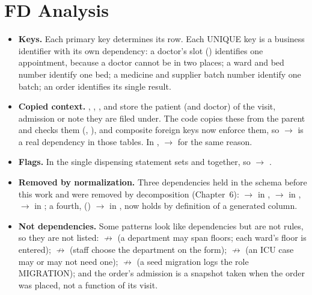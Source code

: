 \section{FD Analysis}
\begin{itemize}
\item \textbf{Keys.} Each primary key determines its row. Each UNIQUE key is a business identifier with its own
dependency: a doctor's slot () identifies one appointment,
because a doctor cannot be in two places; a ward and bed number identify one bed; a medicine and supplier batch
number identify one batch; an order identifies its single result.
\item \textbf{Copied context.} , , , 
and  store the patient (and doctor) of the visit, admission or note they are filed under. The
code copies these from the parent and checks them (, ),
and composite foreign keys now enforce them, so  $\to$  is a real
dependency in those tables. In ,  $\to$  for the same reason.
\item \textbf{Flags.} In  the single dispensing statement sets
 and  together, so  $\to$ .
\item \textbf{Removed by normalization.} Three dependencies held in the schema before this work and were removed
by decomposition (Chapter~6):  $\to$  in ,  $\to$
 in ,  $\to$  in
; a fourth, () $\to$  in
, now holds by definition of a generated column.
\item \textbf{Not dependencies.} Some patterns look like dependencies but are not rules, so they are not listed:
 $\not\to$  (a department may span floors; each ward's floor is entered);
 $\not\to$  (staff choose the department on the form);
 $\not\to$  (an ICU case may or may not need one);
 $\not\to$  (a seed migration logs the role MIGRATION); and the order's admission
is a snapshot taken when the order was placed, not a function of its visit.
\end{itemize}
